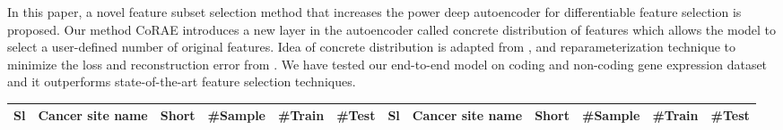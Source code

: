 \documentclass{bioinfo}
\begin{document}
In this paper, a novel feature subset selection method that increases the power deep autoencoder for differentiable feature selection is proposed. Our method CoRAE introduces a new layer in the autoencoder called concrete distribution of features which allows the model to select a user-defined number of original features. Idea of concrete distribution is adapted from \cite{maddison2016concrete, kingma2013auto}, and reparameterization technique to minimize the loss and reconstruction error from \cite{abid2019concrete}. 
We have tested our end-to-end model on coding and non-coding gene expression dataset and it outperforms state-of-the-art feature selection techniques. 

\begin{table}[h!]
 {\begin{tabular}{@{}llllll|llllll@{}}\toprule Sl	&	Cancer site name	&	Short	&	\#Sample	&	\#Train	&	\#Test	&	Sl	&	Cancer site name	&	Short	&	\#Sample	&	\#Train	&	\#Test\\\midrule


\end{tabular}}
\end{table}
\end{document}
